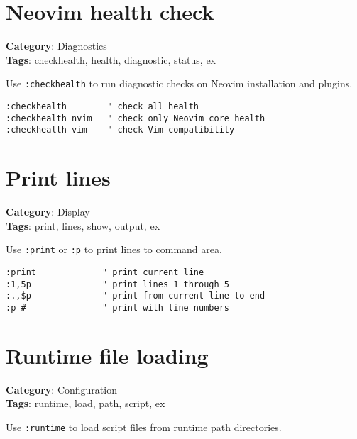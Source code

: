 {{{{{{\section{Neovim health check}

\textbf{Category}: Diagnostics\\ \textbf{Tags}: checkhealth, health, diagnostic, status, ex
\vspace{0.5cm}

Use {\footnotesize \Verb§:checkhealth§} to run diagnostic checks on Neovim installation and plugins.

\begin{Exa*}{}
\begin{Verbatim}[fontsize=\footnotesize, breaklines, breakanywhere]
:checkhealth        " check all health
:checkhealth nvim   " check only Neovim core health
:checkhealth vim    " check Vim compatibility
\end{Verbatim}
\end{Exa*}

\section{Print lines}

\textbf{Category}: Display\\ \textbf{Tags}: print, lines, show, output, ex
\vspace{0.5cm}

Use {\footnotesize \Verb§:print§} or {\footnotesize \Verb§:p§} to print lines to command area.

\begin{Exa*}{}
\begin{Verbatim}[fontsize=\footnotesize, breaklines, breakanywhere]
:print             " print current line
:1,5p              " print lines 1 through 5
:.,$p              " print from current line to end
:p #               " print with line numbers
\end{Verbatim}
\end{Exa*}

\section{Runtime file loading}

\textbf{Category}: Configuration\\ \textbf{Tags}: runtime, load, path, script, ex
\vspace{0.5cm}

Use {\footnotesize \Verb§:runtime§} to load script files from runtime path directories.

}}}}}}
